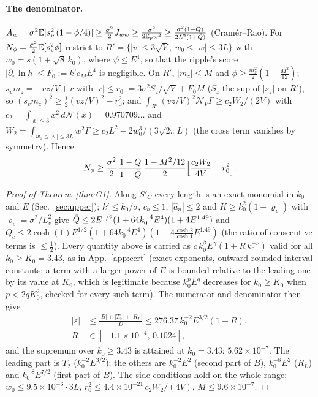 \paragraph*{The denominator.} $A_w=\sigma^2\mathbb{E}[s_w^2(1-\phi/4)]\ge\frac{\sigma^2}2J_{ww}\ge\frac{\sigma^2}{2\mathbb{E}_pw^2}\ge\frac{\sigma^2(1-\bar Q)}{2L^2(1+\bar Q)}$ (Cram\'er--Rao).
For $N_\phi=\frac{\sigma^2}2\mathbb{E}[s_v^2\phi]$ restrict to $R'=\{|v|\le3\sqrt V,\ w_0\le|w|\le3L\}$ with $w_0=s(1+\sqrt8\,k_0)$, where $\psi\le E^4$, so that the
ripple's score $|\partial_v\ln h|\le F_0:=k'c_ME^4$ is negligible. On $R'$, $|m_z|\le M$ and
$\phi\ge\frac{m_z^2}2(1-\frac{M^2}{12})$; $s_vm_z=-vz/V+r$ with $|r|\le r_0:=3\sigma^2S_z/\sqrt V+F_0M$ ($S_z$ the sup of $|s_z|$ on $R'$), so
$(s_vm_z)^2\ge\frac12(vz/V)^2-r_0^2$; and $\int_{R'}(vz/V)^2\mathcal N_V\Gamma\ge c_2W_2/(2V)$ with $c_2=\int_{|x|\le3}x^2\,d\mathcal N(x)=0.970709\ldots$ and
$W_2=\int_{w_0\le|w|\le3L}w^2\Gamma\ge c_2L^2-2w_0^3/(3\sqrt{2\pi}L)$ (the cross term vanishes by symmetry). Hence
\begin{equation*}
N_\phi\ge\frac{\sigma^2}2\,\frac{1-\bar Q}{1+\bar Q}\,\frac{1-M^2/12}2\Big[\frac{c_2W_2}{4V}-r_0^2\Big].
\end{equation*}

\begin{proof}[Proof of Theorem~\ref{thm:G1}]
Along $S'_C$ every length is an exact monomial in $k_0$ and $E$ (Sec.~\ref{sec:upper}); $k'\le k_0/\sigma$, $c_b\le1$, $|\hat a_n|\le2$ and
$K\ge k_0^2(1-\varrho_v)$ with $\varrho_v=\sigma^2/L_v^2$ give $\bar Q\le2E^{1/2}(1+64k_0^{-4}E^4)(1+4E^{1.49})$ and
$Q_c\le2\cosh(1)E^{1/2}(1+64k_0^{-4}E^4)(1+4\frac{\cosh2}{\cosh1}E^{1.49})$ (the ratio of consecutive terms is $\le\frac12$). Every quantity above is carried as
$c\,k_0^\beta E^\gamma(1+R\,k_0^{-\nu})$ valid for all $k_0\ge K_0=3.43$, as in App.~\ref{app:cert} (exact exponents, outward-rounded interval constants;
a term with a larger power of $E$ is bounded relative to the leading one by its value at $K_0$, which is legitimate because
$k_0^{p}E^{q}$ decreases for $k_0\ge K_0$ when $p<2qK_0^2$, checked for every such term). The numerator and denominator then give
\begin{equation*}
\begin{aligned}
|\varepsilon|&\le\frac{|B|+|T_2|+|R_L|}{D}\le276.37\,k_0^{-2}E^{3/2}(1+R),\\
R&\in[-1.1\times10^{-4},\,0.1024],
\end{aligned}
\end{equation*}
and the supremum over $k_0\ge3.43$ is attained at $k_0=3.43$: $5.62\times10^{-7}$. The leading part is $T_2$ ($k_0^{-2}E^{3/2}$); the others are
$k_0^{-2}E^2$ (second part of $B$), $k_0^{-8}E^2$ ($R_L$) and $k_0^{-8}E^{7/2}$ (first part of $B$). The side conditions hold on the whole range:
$w_0\le9.5\times10^{-6}\cdot3L$, $r_0^2\le4.4\times10^{-21}\,c_2W_2/(4V)$, $M\le9.6\times10^{-7}$.
\end{proof}

